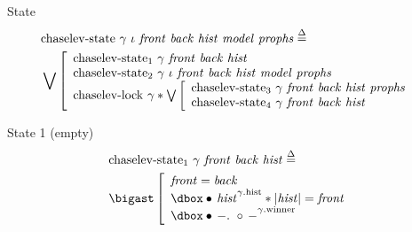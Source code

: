 \begin{frame}{State}
\small
\begin{align*}
		&\mathrm{chaselev \mathhyphen state}\ \gamma\ \iota\ \mathit{front}\ \mathit{back}\ \mathit{hist}\ \mathit{model}\ \mathit{prophs}
		\eqdef
	\\
		&\bigvee\left[\begin{array}{l}
				\mathrm{chaselev \mathhyphen state_1}\ \gamma\ \mathit{front}\ \mathit{back}\ \mathit{hist}
			\\
				\mathrm{chaselev \mathhyphen state_2}\ \gamma\ \iota\ \mathit{front}\ \mathit{back}\ \mathit{hist}\ \mathit{model}\ \mathit{prophs}
			\\
				\mathrm{chaselev \mathhyphen lock}\ \gamma \iSep
				\bigvee\left[\begin{array}{l}
						\mathrm{chaselev \mathhyphen state_3}\ \gamma\ \mathit{front}\ \mathit{back}\ \mathit{hist}\ \mathit{prophs}
					\\
						\mathrm{chaselev \mathhyphen state_4}\ \gamma\ \mathit{front}\ \mathit{back}\ \mathit{hist}
				\end{array}\right.
		\end{array}\right.
\end{align*}
\end{frame}


\begin{frame}{State 1 (empty)}
\begin{align*}
		&\mathrm{chaselev \mathhyphen state_1}\ \gamma\ \mathit{front}\ \mathit{back}\ \mathit{hist}
		\eqdef
	\\
		&\iBigsep\left[\begin{array}{l}
				\mathit{front} = \mathit{back}
			\\
				\iGhost{\gamma\mathrm{.hist}}{\iAuth{\mathit{hist}}} \iSep
				| \mathit{hist} | = \mathit{front}
			\\
				\iGhost{\gamma\mathrm{.winner}}{\iAuth{-} .\ \iFrag{-}}
		\end{array}\right.
\end{align*}
\end{frame}


